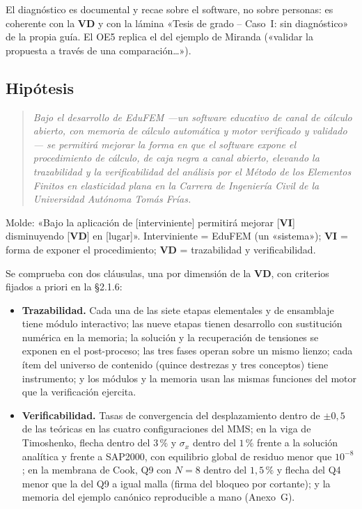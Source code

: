 \documentclass[11pt,a4paper]{article}
\newcommand{\vi}{\textbf{VI}}
\newcommand{\vd}{\textbf{VD}}
\newcommand{\molde}[1]{\textcolor{blue!60!black}{\small #1}}
\newcommand{\pegar}[1]{\begin{quote}\itshape #1\end{quote}}
\begin{document}
El diagnóstico es documental y recae sobre el software, no sobre personas: es coherente con la \vd{} y con la lámina «Tesis de grado -- Caso~I: sin diagnóstico» de la propia guía. El OE5 replica el del ejemplo de Miranda («validar la propuesta a través de una comparación\dots»).

\subsection{Hipótesis}

\pegar{Bajo el desarrollo de EduFEM —un software educativo de canal de cálculo abierto, con memoria de cálculo automática y motor verificado y validado— se permitirá mejorar la forma en que el software expone el procedimiento de cálculo, de caja negra a canal abierto, elevando la trazabilidad y la verificabilidad del análisis por el Método de los Elementos Finitos en elasticidad plana en la Carrera de Ingeniería Civil de la Universidad Autónoma Tomás Frías.}

\molde{Molde: «Bajo la aplicación de [interviniente] permitirá mejorar [\vi] disminuyendo [\vd] en [lugar]». Interviniente = EduFEM (un «sistema»); \vi{} = forma de exponer el procedimiento; \vd{} = trazabilidad y verificabilidad.}

Se comprueba con dos cláusulas, una por dimensión de la \vd, con criterios fijados a priori en la §2.1.6:
\begin{itemize}
\item[(a)] \textbf{Trazabilidad.} Cada una de las siete etapas elementales y de ensamblaje tiene módulo interactivo; las nueve etapas tienen desarrollo con sustitución numérica en la memoria; la solución y la recuperación de tensiones se exponen en el post-proceso; las tres fases operan sobre un mismo lienzo; cada ítem del universo de contenido (quince destrezas y tres conceptos) tiene instrumento; y los módulos y la memoria usan las mismas funciones del motor que la verificación ejercita.
\item[(b)] \textbf{Verificabilidad.} Tasas de convergencia del desplazamiento dentro de $\pm0{,}5$ de las teóricas en las cuatro configuraciones del MMS; en la viga de Timoshenko, flecha dentro del $3\,\%$ y $\sigma_x$ dentro del $1\,\%$ frente a la solución analítica y frente a SAP2000, con equilibrio global de residuo menor que $10^{-8}$; en la membrana de Cook, Q9 con $N=8$ dentro del $1{,}5\,\%$ y flecha del Q4 menor que la del Q9 a igual malla (firma del bloqueo por cortante); y la memoria del ejemplo canónico reproducible a mano (Anexo~G).
\end{itemize}
\end{document}
